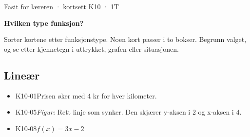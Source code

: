 \documentclass[11pt,a4paper]{article}
\begin{document}
\begin{minipage}[t]{0.8\linewidth}\vspace{0pt}
{\sffamily\small\color{dempet}Fasit for læreren · kortsett K10 · 1T}\par\vspace{0.25em}
{\fontsize{20}{24}\selectfont\bfseries Hvilken type funksjon?}\par\vspace{0.5em}
Sorter kortene etter funksjonstype. Noen kort passer i to bokser. Begrunn valget, og se etter kjennetegn i uttrykket, grafen eller situasjonen.\par{}
\end{minipage}\hfill
\begin{minipage}[t]{0.15\linewidth}\vspace{0pt}\raggedleft
{}
\end{minipage}\par\vspace{0.8em}

\subsection*{Lineær}
\begin{itemize}[leftmargin=1.2em, itemsep=0.35em]
\item \textsf{\small K10-01}\quad Prisen øker med 4 kr for hver kilometer.
\item \textsf{\small K10-05}\quad \emph{Figur:} Rett linje som synker. Den skjærer y-aksen i 2 og x-aksen i 4.
\item \textsf{\small K10-08}\quad $f(x) = 3x - 2$
\end{itemize}
\end{document}
